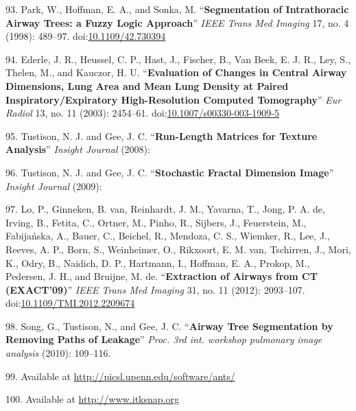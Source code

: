 \documentclass[11pt,]{article}
\begin{document}
93. Park, W., Hoffman, E. A., and Sonka, M. ``\textbf{Segmentation of
Intrathoracic Airway Trees: a Fuzzy Logic Approach}'' \emph{IEEE Trans
Med Imaging} 17, no. 4 (1998): 489--97.
doi:\href{http://dx.doi.org/10.1109/42.730394}{10.1109/42.730394}

94. Ederle, J. R., Heussel, C. P., Hast, J., Fischer, B., Van Beek, E.
J. R., Ley, S., Thelen, M., and Kauczor, H. U. ``\textbf{Evaluation of
Changes in Central Airway Dimensions, Lung Area and Mean Lung Density at
Paired Inspiratory/Expiratory High-Resolution Computed Tomography}''
\emph{Eur Radiol} 13, no. 11 (2003): 2454--61.
doi:\href{http://dx.doi.org/10.1007/s00330-003-1909-5}{10.1007/s00330-003-1909-5}

95. Tustison, N. J. and Gee, J. C. ``\textbf{Run-Length Matrices for
Texture Analysis}'' \emph{Insight Journal} (2008):

96. Tustison, N. J. and Gee, J. C. ``\textbf{Stochastic Fractal
Dimension Image}'' \emph{Insight Journal} (2009):

97. Lo, P., Ginneken, B. van, Reinhardt, J. M., Yavarna, T., Jong, P. A.
de, Irving, B., Fetita, C., Ortner, M., Pinho, R., Sijbers, J.,
Feuerstein, M., Fabija{ń}ska, A., Bauer, C., Beichel, R., Mendoza, C.
S., Wiemker, R., Lee, J., Reeves, A. P., Born, S., Weinheimer, O.,
Rikxoort, E. M. van, Tschirren, J., Mori, K., Odry, B., Naidich, D. P.,
Hartmann, I., Hoffman, E. A., Prokop, M., Pedersen, J. H., and Bruijne,
M. de. ``\textbf{Extraction of Airways from CT (EXACT'09)}'' \emph{IEEE
Trans Med Imaging} 31, no. 11 (2012): 2093--107.
doi:\href{http://dx.doi.org/10.1109/TMI.2012.2209674}{10.1109/TMI.2012.2209674}

98. Song, G., Tustison, N., and Gee, J. C. ``\textbf{Airway Tree
Segmentation by Removing Paths of Leakage}'' \emph{Proc. 3rd int.
workshop pulmonary image analysis} (2010): 109--116.

99. Available at \url{http://picsl.upenn.edu/software/ants/}

100. Available at \url{http://www.itksnap.org}
\end{document}

